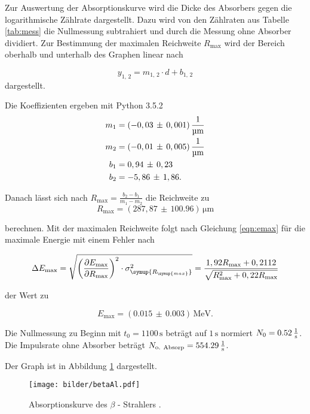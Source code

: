 Zur Auswertung der Absorptionskurve wird die Dicke des Absorbers gegen die
logarithmische Zählrate dargestellt. Dazu wird von den Zählraten aus
Tabelle \ref{tab:mess} die Nullmessung subtrahiert und durch die Messung
ohne Absorber dividiert. Zur Bestimmung der maximalen Reichweite
$R_\text{max}$ wird der Bereich oberhalb und unterhalb des Graphen linear
nach

\begin{equation}
 y_\text{1, 2} = m_\text{1, 2} \cdot d + b_\text{1, 2}
\end{equation}
dargestellt.

Die Koeffizienten ergeben mit Python 3.5.2
\begin{align*}
 m_\text{1} &=
(-0,03\,\pm\,0,001)\,\si[per-mode=fraction]{\per\micro\meter}\\
 m_\text{2} &=
(-0,01\,\pm\,0,005)\,\si[per-mode=fraction]{\per\micro\meter} \\
 b_\text{1} &= 0,94\,\pm\,0,23\\
 b_\text{2} &= -5,86\,\pm\,1,86.
\end{align*}

Danach lässt sich nach $R_\text{max} = \frac{b_\text{2} -
b_\text{1}}{m_\text{1} - m_\text{2}}$ die Reichweite zu
\begin{equation}
 R_\text{max} = (287,87\,\pm\,100.96)\,\si{\micro\meter}
\end{equation}

berechnen. Mit der maximalen Reichweite folgt nach Gleichung
\eqref{eqn:emax} für die maximale Energie mit einem Fehler nach

\begin{equation}
 \Delta E_\text{max} = \sqrt{\left(\frac{\partial E_\text{max}}{\partial
R_\text{max}}\right)^2 \cdot \sigma_\symup{R_\symup{max}}^2} =
\frac{1,92 R_\text{max} + 0,2112}{\sqrt{R_\text{max}^2 + 0,22
R_\text{max}}}
\end{equation}

der Wert zu

\begin{equation}
 E_\text{max} = (0.015\,\pm\,0.003)\,\si{\mega\electronvolt}.
\end{equation}
\par\bigskip

Die Nullmessung zu Beginn mit $t_\text{0} = 1100\,\si{\second}$ beträgt
auf $1\,\si{\second}$ normiert $N_\text{0} =
0.52\,\si[per-mode=fraction]{\per\second}$. Die Impulsrate ohne Absorber
beträgt $N_\text{o. Absorp} =
554.29\,\si[per-mode=fraction]{\per\second}$.

Der Graph ist in Abbildung \ref{fig:absorp} dargestellt.

\begin{figure}[H]
 \centering
 \texttt{[image: bilder/betaAl.pdf]}
 \caption{Absorptionskurve des $\beta$ - Strahlers .}
 \label{fig:absorp}
\end{figure}
